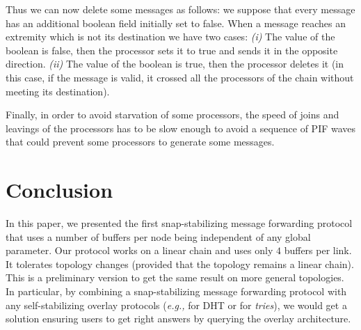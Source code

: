 \documentclass{llncs}
\newcommand{\eg}{\emph{e.g., }}
\begin{document}
Thus we can now delete some messages as follows: we suppose that every message has an additional boolean field
initially set to false. When a message reaches an extremity which is not its destination we have two cases:
\textit{(i)} The value of the boolean is false, then the processor sets it to true and sends it in the opposite
direction. \textit{(ii)} The value of the boolean is true, then the processor deletes it (in this case, if the message
is valid, it crossed all the processors of the chain without meeting its destination).

Finally, in order to avoid starvation of some processors, the speed of joins and leavings of the processors has to be
slow enough to avoid a sequence of PIF waves that could prevent some processors to generate some messages.





\section{Conclusion\label{sec:conclu}}

In this paper, we presented the first snap-stabilizing message forwarding protocol that uses 
a number of buffers per node being independent of any global parameter.  Our protocol works on a linear chain and 
uses only $4$ buffers per link.  
It tolerates topology changes (provided that the topology remains a linear chain). 
This is a preliminary version to get the same result on more general topologies.  
In particular, by combining a snap-stabilizing message forwarding protocol with any self-stabilizing overlay protocols 
(\eg \cite{BBKLPR10} for DHT or \cite{AspnesS2003,CDPT07,CDPT08} for \emph{tries}), we would get a solution
ensuring users to get right answers by querying the overlay architecture.

\begin{scriptsize}


\end{scriptsize}
\end{document}
